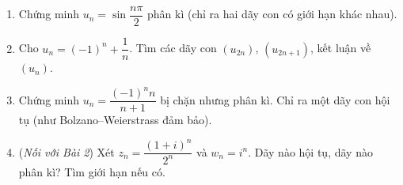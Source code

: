\documentclass[11pt, a4paper, twoside]{article}
\newcommand{\bt}[1]{\textbf{\color{badgecolor}#1}}
\begin{document}
\begin{ts}
\begin{enumerate}[label=\bt{F\arabic*.}, leftmargin=*, itemsep=4pt]
  \item Chứng minh $u_n=\sin\dfrac{n\pi}2$ phân kì (chỉ ra hai dãy con có giới hạn khác nhau).
  \item Cho $u_n=(-1)^n+\dfrac1n$. Tìm các dãy con $(u_{2n})$, $(u_{2n+1})$, kết luận về $(u_n)$.
  \item Chứng minh $u_n=\dfrac{(-1)^nn}{n+1}$ bị chặn nhưng phân kì. Chỉ ra một dãy con hội tụ (như Bolzano--Weierstrass đảm bảo).
  \item (\emph{Nối với Bài 2}) Xét $z_n=\dfrac{(1+i)^n}{2^n}$ và $w_n=i^n$. Dãy nào hội tụ, dãy nào phân kì? Tìm giới hạn nếu có.
\end{enumerate}
\end{ts}
\end{document}
